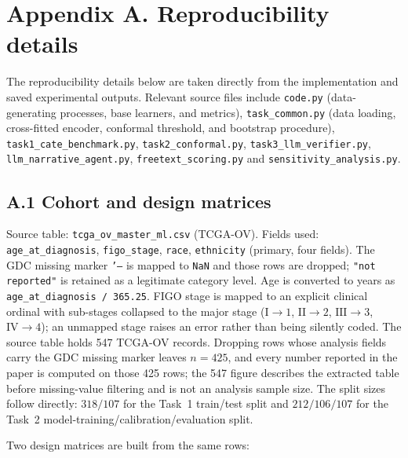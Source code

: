 \appendix
\section*{Appendix A. Reproducibility details}

The reproducibility details below are taken directly from the implementation and saved experimental outputs. Relevant source files include \texttt{code.py} (data-generating processes, base learners, and metrics), \texttt{task\_common.py} (data loading, cross-fitted encoder, conformal threshold, and bootstrap procedure),
\texttt{task1\_cate\_benchmark.py}, \texttt{task2\_conformal.py},
\texttt{task3\_llm\_verifier.py}, \texttt{llm\_narrative\_agent.py},
\texttt{freetext\_scoring.py} and \texttt{sensitivity\_analysis.py}.

\subsection*{A.1 Cohort and design matrices}

Source table: \texttt{tcga\_ov\_master\_ml.csv} (TCGA-OV). Fields used:
\texttt{age\_at\_diagnosis}, \texttt{figo\_stage}, \texttt{race},
\texttt{ethnicity} (primary, four fields).
The GDC missing marker \texttt{'--} is mapped to
\texttt{NaN} and those rows are dropped; \texttt{"not reported"} is retained as
a legitimate category level. Age is converted to years as
\texttt{age\_at\_diagnosis / 365.25}. FIGO stage is mapped to an explicit
clinical ordinal with sub-stages collapsed to the major stage
($\mathrm{I}\!\to\!1$, $\mathrm{II}\!\to\!2$, $\mathrm{III}\!\to\!3$,
$\mathrm{IV}\!\to\!4$); an unmapped stage raises an error rather than being
silently coded. The source table holds 547 TCGA-OV records. Dropping rows whose
analysis fields carry the GDC missing marker leaves $n = 425$, and every number
reported in the paper is computed on those 425 rows; the 547 figure describes the
extracted table before missing-value filtering and is not an analysis sample size.
The split sizes follow directly: $318/107$ for the Task~1 train/test split and
$212/106/107$ for the Task~2 model-training/calibration/evaluation split.

Two design matrices are built from the same rows:

